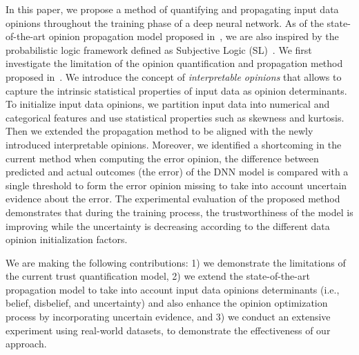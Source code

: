 In this paper, we propose a method of quantifying and propagating input data opinions throughout the training phase of a deep neural network. As of the state-of-the-art opinion propagation model proposed in~\cite{hope}, we are also inspired by the probabilistic logic framework defined as Subjective Logic (SL)~\cite{sl}. We first investigate the limitation of the opinion quantification and propagation method proposed in~\cite{sl}. We introduce the concept of \emph{interpretable opinions} that allows to capture the intrinsic statistical properties of input data as opinion determinants. To initialize input data opinions, we partition input data into numerical and categorical features and use statistical properties such as skewness and kurtosis. Then we extended the propagation method to be aligned with the newly introduced interpretable opinions. Moreover, we identified a shortcoming in the current method when computing the error opinion, the difference between predicted and actual outcomes (the error) of the DNN model is compared with a single threshold to form the error opinion missing to take into account uncertain evidence about the error. 
The experimental evaluation of the proposed method demonstrates that during the training process, the trustworthiness of the model is improving while the uncertainty is decreasing according to the different data opinion initialization factors.

We are making the following contributions: 1) we demonstrate the limitations of the current trust quantification model, 
2) we extend the state-of-the-art propagation model to take into account input data opinions determinants (i.e., belief, disbelief, and uncertainty) and also enhance the opinion optimization process by incorporating uncertain evidence, and 3) we conduct an extensive experiment using real-world datasets, to demonstrate the effectiveness of our approach.  

